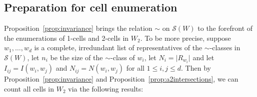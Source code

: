 \documentclass[ALCO,Unicode,published]{cedram}
\newcommand{\la}{\mathbf{a}}
\newcommand{\sw}{\mathcal{S}(W)}
\newcommand{\abs}[1]{\lvert #1 \rvert}
\begin{document}
\begin{example}
\begin{table}\centering {}
\vspace{1em} 
    \caption{Zero-sided cells of $\la$-value 2 in type $B_4$}
        \label{tab:0cellsB4}
    \end{table} 
 \end{example}

\subsection{Preparation for cell enumeration}
\label{sec:cellData}
Proposition~\ref{prop:invariance} brings the relation $\sim$ on $\sw$ to the forefront of the enumerations of
1-cells and 2-cells in $W_2$. To be more precise, suppose $w_1,\dots,w_d$ is a complete, irredundant
list of representatives of the $\sim$-classes in $\sw$, let $n_i$ be the size of the $\sim$-class of
$w_i$, let $N_i=\abs{R_{w_i}}$ and let~$I_{ij}=I(w_i,w_j)$ and $N_{ij}=N(w_i,w_j)$ for all $1\le
i,j\le d$. Then by Proposition~\ref{prop:invariance} and Proposition~\ref{prop:a2intersections}, we can count all cells in
$W_2$ via the following results: 
\end{document}
